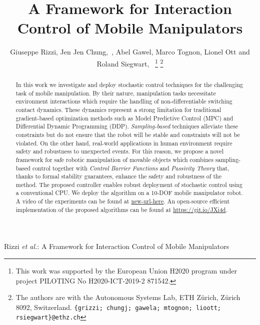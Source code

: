 \documentclass[journal]{IEEEtran}  %
\begin{document}
\title{
A Framework for Interaction Control of Mobile Manipulators
}


\author{Giuseppe Rizzi, Jen Jen Chung,~, Abel Gawel, Marco Tognon, Lionel Ott and Roland Siegwart,~%
\thanks{This work was supported by the European Union H2020 program under project PILOTING No H2020-ICT-2019-2 871542.}
\thanks{The authors are with the Autonomous Systems Lab, ETH Z\"urich, Z\"urich 8092, Switzerland. {\tt\small\{grizzi; chungj; gawela; mtognon; lioott; rsiegwart\}@ethz.ch}}%
}

%                              
{Rizzi \MakeLowercase{\textit{et al.}}: A Framework for Interaction Control of Mobile Manipulators}




\maketitle


\begin{abstract}

In this work we investigate and deploy stochastic control techniques for the challenging task of mobile manipulation. By their nature, manipulation tasks necessitate environment interactions which require the handling of non-differentiable switching contact dynamics. These dynamics represent a strong limitation for traditional gradient-based optimization methods such as Model Predictive Control (MPC) and Differential Dynamic Programming (DDP). \emph{Sampling-based} techniques alleviate these constraints but do not ensure that the robot will be stable and constraints will not be violated. On the other hand, real-world applications in human environment require safety and robustness to unexpected events. For this reason, we propose a novel framework for safe robotic manipulation of movable objects which combines sampling-based control together with \emph{Control Barrier Functions} and \emph{Passivity Theory} that, thanks to formal stability guarantees, enhance the safety and robustness of the method. The proposed controller enables robust deployment of stochastic control using a conventional CPU. We deploy the algorithm on a 10-DOF mobile manipulator robot. A video of the experiments can be found at \url{new-url-here}. An open-source efficient implementation of the proposed algorithms can be found at \url{https://git.io/JXi4d}.
\end{abstract}
\end{document}
